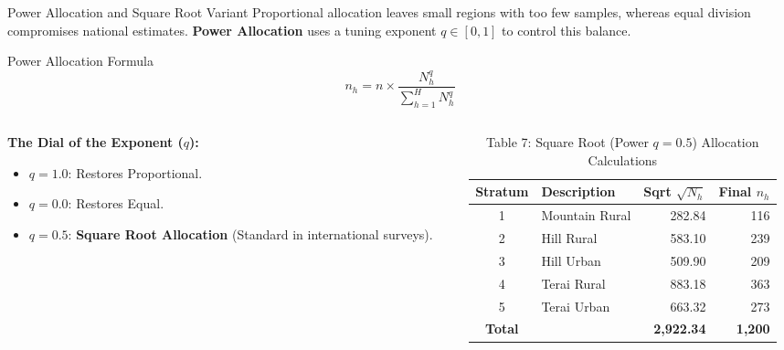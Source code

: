 \documentclass[10pt, aspectratio=169]{beamer}
\begin{document}
  \begin{frame}{Power Allocation and Square Root Variant}
      Proportional allocation leaves small regions with too few samples, whereas equal division compromises national estimates. \textbf{Power Allocation} uses a tuning exponent $q \in [0, 1]$ to control this balance.
      
      \begin{block}{Power Allocation Formula}
          $$n_h = n \times \frac{N_h^q}{\sum_{h=1}^H N_h^q}$$
      \end{block}
      
      \begin{columns}
          \begin{column}{0.5\textwidth}
              \textbf{The Dial of the Exponent ($q$):}
              \begin{itemize}
                  \item $q = 1.0$: Restores Proportional.
                  \item $q = 0.0$: Restores Equal.
                  \item $q = 0.5$: \textbf{Square Root Allocation} (Standard in international surveys).
              \end{itemize}
          \end{column}
          \begin{column}{0.5\textwidth}
              \begin{table}
                  \caption{Table 7: Square Root (Power $q=0.5$) Allocation Calculations}
                  \tiny
                  \begin{tabularx}{\textwidth}{clrr}
                      \toprule
                      \textbf{Stratum} & \textbf{Description} & \textbf{Sqrt $\sqrt{N_h}$} & \textbf{Final $n_h$} \\
                      \midrule
                      1 & Mountain Rural & 282.84 & 116 \\
                      2 & Hill Rural & 583.10 & 239 \\
                      3 & Hill Urban & 509.90 & 209 \\
                      4 & Terai Rural & 883.18 & 363 \\
                      5 & Terai Urban & 663.32 & 273 \\
                      \midrule
                      \textbf{Total} & & \textbf{2,922.34} & \textbf{1,200} \\
                      \bottomrule
                  \end{tabularx}
              \end{table}
          \end{column}
      \end{columns}
  \end{frame}
  
\end{document}
